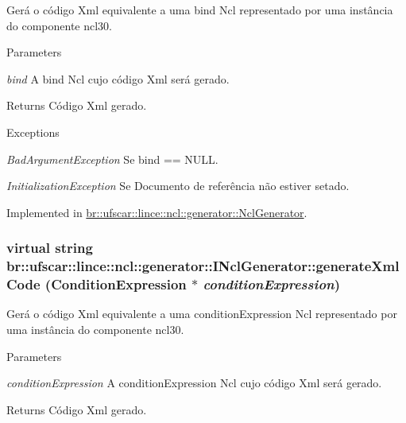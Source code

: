 Gerá o código Xml equivalente a uma bind Ncl representado por uma instância do componente ncl30. 


\begin{DoxyParams}{Parameters}
\item[{\em bind}]A bind Ncl cujo código Xml será gerado. \end{DoxyParams}
\begin{DoxyReturn}{Returns}
Código Xml gerado. 
\end{DoxyReturn}

\begin{DoxyExceptions}{Exceptions}
\item[{\em BadArgumentException}]Se bind == NULL. \item[{\em InitializationException}]Se Documento de referência não estiver setado. \end{DoxyExceptions}


Implemented in \hyperlink{classbr_1_1ufscar_1_1lince_1_1ncl_1_1generator_1_1NclGenerator_abd146c724f44d5750a92979d8fe53b34}{br::ufscar::lince::ncl::generator::NclGenerator}.

\hypertarget{classbr_1_1ufscar_1_1lince_1_1ncl_1_1generator_1_1INclGenerator_aa03215531edbb0cc50097b2f6de3eda9}{
\subsubsection[{generateXmlCode}]{\setlength{\rightskip}{0pt plus 5cm}virtual string br::ufscar::lince::ncl::generator::INclGenerator::generateXmlCode (ConditionExpression $\ast$ {\em conditionExpression})}}
\label{classbr_1_1ufscar_1_1lince_1_1ncl_1_1generator_1_1INclGenerator_aa03215531edbb0cc50097b2f6de3eda9}


Gerá o código Xml equivalente a uma conditionExpression Ncl representado por uma instância do componente ncl30. 


\begin{DoxyParams}{Parameters}
\item[{\em conditionExpression}]A conditionExpression Ncl cujo código Xml será gerado. \end{DoxyParams}
\begin{DoxyReturn}{Returns}
Código Xml gerado. 
\end{DoxyReturn}

